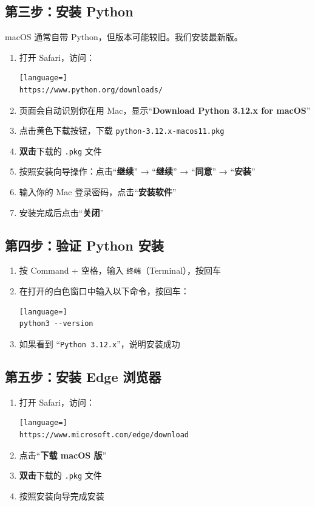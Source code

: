 \documentclass[12pt,a4paper]{ctexart}
\newcommand{\cmdSpace}{\faApple{}Command + 空格}
\begin{document}
\subsection{第三步：安装 Python}

macOS 通常自带 Python，但版本可能较旧。我们安装最新版。

\begin{enumerate}
  \item 打开 Safari，访问：
    \begin{lstlisting}[language=]
https://www.python.org/downloads/
\end{lstlisting}
  \item 页面会自动识别你在用 Mac，显示``\textbf{Download Python 3.12.x for macOS}''
  \item 点击黄色下载按钮，下载 \texttt{python-3.12.x-macos11.pkg}
  \item \textbf{双击}下载的 \texttt{.pkg} 文件
  \item 按照安装向导操作：点击``\textbf{继续}'' → ``\textbf{继续}'' →
    ``\textbf{同意}'' → ``\textbf{安装}''
  \item 输入你的 Mac 登录密码，点击``\textbf{安装软件}''
  \item 安装完成后点击``\textbf{关闭}''
\end{enumerate}

\subsection{第四步：验证 Python 安装}

\begin{enumerate}
  \item 按 \cmdSpace{}，输入 \texttt{终端}（Terminal），按回车
  \item 在打开的白色窗口中输入以下命令，按回车：
    \begin{lstlisting}[language=]
python3 --version
\end{lstlisting}
  \item 如果看到 ``\texttt{Python 3.12.x}''，说明安装成功
\end{enumerate}

\subsection{第五步：安装 Edge 浏览器}

\begin{enumerate}
  \item 打开 Safari，访问：
    \begin{lstlisting}[language=]
https://www.microsoft.com/edge/download
\end{lstlisting}
  \item 点击``\textbf{下载 macOS 版}''
  \item \textbf{双击}下载的 \texttt{.pkg} 文件
  \item 按照安装向导完成安装
\end{enumerate}
\end{document}
